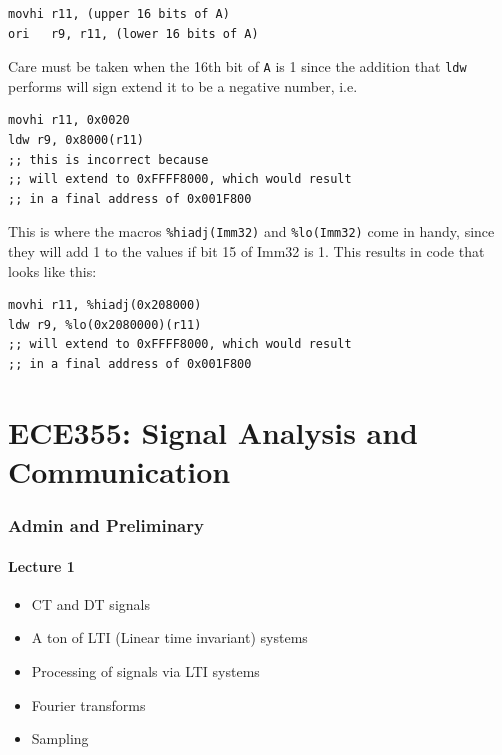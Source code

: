 \documentclass[10pt]{article}
\begin{document}
\begin{listing}[H]
\begin{verbatim}
movhi r11, (upper 16 bits of A)
ori   r9, r11, (lower 16 bits of A)
\end{verbatim}
\end{listing}


Care must be taken when the 16th bit of \texttt{A}  is 1 since the addition that \texttt{ldw} performs will sign extend it to be a negative number, i.e. 

\begin{listing}[H]
	\begin{verbatim}
movhi r11, 0x0020
ldw r9, 0x8000(r11)
;; this is incorrect because
;; will extend to 0xFFFF8000, which would result
;; in a final address of 0x001F800
\end{verbatim}
\end{listing}


This is where the macros \texttt{\%hiadj(Imm32)}  and \texttt{\%lo(Imm32)} come in handy, since they will add 1 to the values if bit 15 of Imm32 is 1. 
This results in code that looks like this:


\begin{listing}[H]
	\begin{verbatim}
movhi r11, %hiadj(0x208000)
ldw r9, %lo(0x2080000)(r11)
;; will extend to 0xFFFF8000, which would result
;; in a final address of 0x001F800
\end{verbatim}
\end{listing}






\part{ECE355: Signal Analysis and Communication}


\section{Admin and Preliminary}
\subsection{Lecture 1}
\begin{itemize}
	\item  CT and DT signals
	\item A ton of LTI (Linear time invariant) systems
	\item Processing of signals via LTI systems
	\item Fourier transforms
	\item Sampling
\end{itemize}
\end{document}
